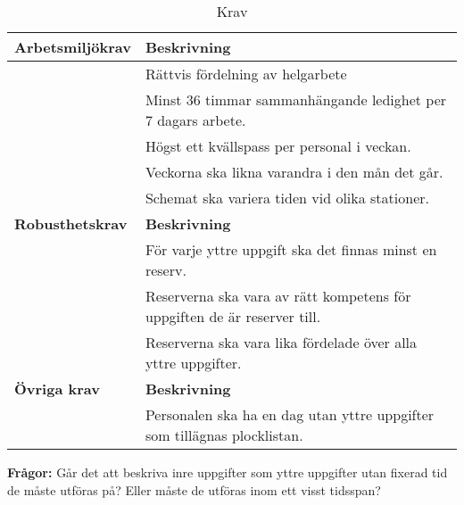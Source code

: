 \begin{table}
\caption{Krav}
\label{tab3}
\begin{tabular}[H]{|l|l|}
\hline
\textbf{Arbetsmiljökrav} & \textbf{Beskrivning} \\ \hline
 & Rättvis fördelning av helgarbete \
\\ \hline 
 & Minst 36 timmar sammanhängande ledighet per 7 dagars arbete.
\\ \hline 
 & Högst ett kvällspass per personal i veckan.
\\ \hline 
 & Veckorna ska likna varandra i den mån det går.
\\ \hline 
 & Schemat ska variera tiden vid olika stationer.
\\ \hline 

\textbf{Robusthetskrav} & \textbf{Beskrivning} \\ \hline
 & För varje yttre uppgift ska det finnas minst en reserv.
\\ \hline 
 & Reserverna ska vara av rätt kompetens för uppgiften de är reserver till.
\\ \hline 
 & Reserverna ska vara lika fördelade över alla yttre uppgifter.
\\ \hline 

\textbf{Övriga krav} & \textbf{Beskrivning} \\ \hline
 & Personalen ska ha en dag utan yttre uppgifter som tillägnas plocklistan.
\\ \hline 
\end{tabular}
\end{table}
\medskip

\textbf{Frågor:} Går det att beskriva inre uppgifter som yttre uppgifter utan fixerad tid de måste utföras på? Eller måste de utföras inom ett visst tidsspan?

